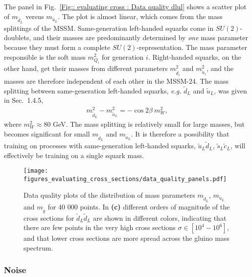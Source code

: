 \documentclass[twoside,english]{uiofysmaster}
\begin{document}
{The panel in Fig.~\ref{Fig:: evaluating cross : Data quality dlul} shows a scatter plot of $m_{\widetilde{d}_L}$ versus $m_{\widetilde{u}_L}$. The plot is almost linear, which comes from the mass splittings of the MSSM. Same-generation left-handed squarks come in $SU(2)$-doublets, and their masses are predominantly determined by \textit{one} mass parameter because they must form a complete $SU(2)$-representation. The mass parameter responsible is the soft mass $m_{Q_i}^2$ for generation $i$.  Right-handed squarks, on the other hand, get their masses from different parameters $m_{\widetilde{d}_i}^2$ and $m_{\widetilde{u}_i}^2$, and the masses are therefore independent of each other in the MSSM-24. The mass splitting between same-generation left-handed squarks, \textit{e.g.} $\widetilde{d}_L$ and $\widetilde{u}_L$, was given in Sec.~1.4.5,
\begin{align*}
m_{\widetilde{d}_L}^2 - m_{\widetilde{u}_L}^2 = - \cos 2 \beta ~m_W^2,
\end{align*}
where $m_W^2 \approx 80$ GeV. The mass splitting is relatively small for large masses, but becomes significant for small $m_{\widetilde{d}_L}$ and $m_{\widetilde{u}_L}$. It is therefore a possibility that training on processes with same-generation left-handed squarks, $\widetilde{u}_L \widetilde{d}_L$, $\widetilde{s}_L \widetilde{c}_L$, will effectively be training on a single squark mass. 


\begin{figure}
\centering
\texttt{[image: figures\_evaluating\_cross\_sections/data\_quality\_panels.pdf]}
\caption{Data quality plots of the distribution of mass parameters $m_{\widetilde{d}_L}$, $m_{\widetilde{u}_L}$ and $m_{\widetilde{g}}$ for 40 000 points. In \textbf{(c)} different orders of magnitude of the cross sections for $\widetilde{d}_L \widetilde{d}_L$ are shown in different colors, indicating that there are few points in the very high cross sections $\sigma \in [10^{4}-10^{6}]$, and that lower cross sections are more spread across the gluino mass spectrum. }
\label{Fig:: evaluating cross : Data quality}
\end{figure}

\subsubsection{Noise}\label{Sec:: evaluating cross : Noise in dataset}

}
\end{document}
